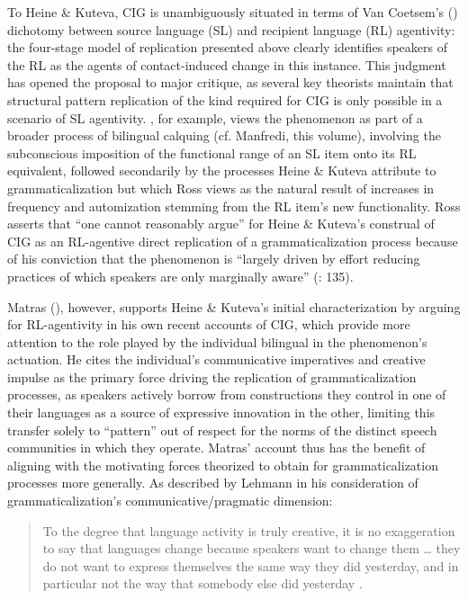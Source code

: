 \documentclass[output=paper]{langsci/langscibook}
\begin{document}
To Heine \& Kuteva, CIG is unambiguously situated in terms of Van Coetsem’s (\citeyear{VanCoetsem1988,VanCoetsem2000}) dichotomy between source language (SL) and recipient language (RL) agentivity: the four-stage model of replication presented above clearly identifies speakers of the RL as the agents of contact-induced change in this instance. This judgment has opened the proposal to major critique, as several key theorists maintain that structural pattern replication of the kind required for CIG is only possible in a scenario of SL agentivity. \citet{Ross2007}, for example, views the phenomenon as part of a broader process of bilingual calquing (cf. Manfredi, this volume), involving the subconscious imposition of the functional range of an SL item onto its RL equivalent, followed secondarily by the processes Heine \& Kuteva attribute to grammaticalization but which Ross views as the natural result of increases in frequency and automization stemming from the RL item’s new functionality. Ross asserts that “one cannot reasonably argue” for Heine \& Kuteva’s construal of CIG as an RL-agentive direct replication of a grammaticalization process because of his conviction that the phenomenon is “largely driven by effort reducing practices of which speakers are only marginally aware” (\citeyear{Ross2007}: 135). 

Matras (\citeyear{Matras2009,Matras2011gram}), however, supports Heine \& Kuteva’s initial characterization by arguing for RL-agentivity in his own recent accounts of CIG, which provide more attention to the role played by the individual bilingual in the phenomenon’s actuation. He cites the individual’s communicative imperatives and creative impulse as the primary force driving the replication of grammaticalization processes, as speakers actively borrow from constructions they control in one of their languages as a source of expressive innovation in the other, limiting this transfer solely to “pattern” out of respect for the norms of the distinct speech communities in which they operate. Matras’ account thus has the benefit of aligning with the motivating forces theorized to obtain for grammaticalization processes more generally. As described by Lehmann in his consideration of grammaticalization’s communicative/pragmatic dimension:

\begin{quote}
To the degree that language activity is truly creative, it is no exaggeration to say that languages change because speakers want to change them … they do not want to express themselves the same way they did yesterday, and in particular not the way that somebody else did yesterday \citep[315]{Lehmann1985}.
\end{quote}
\end{document}
